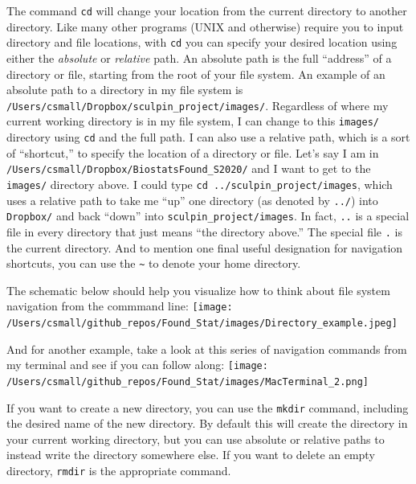 \documentclass[]{book}
\begin{document}
The command \texttt{cd} will change your location from the current directory to another directory. Like many other programs (UNIX and otherwise) require you to input directory and file locations, with \texttt{cd} you can specify your desired location using either the \emph{absolute} or \emph{relative} path. An absolute path is the full ``address'' of a directory or file, starting from the root of your file system. An example of an absolute path to a directory in my file system is \texttt{/Users/csmall/Dropbox/sculpin\_project/images/}. Regardless of where my current working directory is in my file system, I can change to this \texttt{images/} directory using \texttt{cd} and the full path. I can also use a relative path, which is a sort of ``shortcut,'' to specify the location of a directory or file. Let's say I am in \texttt{/Users/csmall/Dropbox/BiostatsFound\_S2020/} and I want to get to the \texttt{images/} directory above. I could type \texttt{cd\ ../sculpin\_project/images}, which uses a relative path to take me ``up'' one directory (as denoted by \texttt{../}) into \texttt{Dropbox/} and back ``down'' into \texttt{sculpin\_project/images}. In fact, \texttt{..} is a special file in every directory that just means ``the directory above.'' The special file \texttt{.} is the current directory. And to mention one final useful designation for navigation shortcuts, you can use the \texttt{\textasciitilde{}} to denote your home directory.

The schematic below should help you visualize how to think about file system navigation from the commmand line:
\texttt{[image: /Users/csmall/github\_repos/Found\_Stat/images/Directory\_example.jpeg]}

And for another example, take a look at this series of navigation commands from my terminal and see if you can follow along:
\texttt{[image: /Users/csmall/github\_repos/Found\_Stat/images/MacTerminal\_2.png]}

If you want to create a new directory, you can use the \texttt{mkdir} command, including the desired name of the new directory. By default this will create the directory in your current working directory, but you can use absolute or relative paths to instead write the directory somewhere else. If you want to delete an empty directory, \texttt{rmdir} is the appropriate command.
\end{document}
